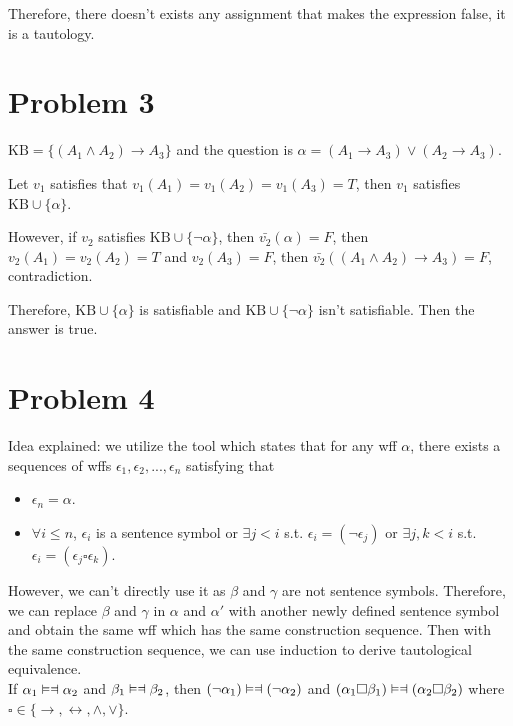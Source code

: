 \documentclass{article}
\newcommand \logequiv						{\vDash\mathrel{\text{\reflectbox{$\vDash$}}}}
\begin{document}
Therefore, there doesn't exists any assignment that makes the expression false, it is a tautology.

\section*{Problem 3}

$\text{KB} = \{ \left( A_1 \land A_2 \right) \to A_3 \}$ and the question is $\alpha = (A_1\to A_3) \lor (A_2\to A_3)$.

Let $v_1$ satisfies that $v_1(A_1)=v_1(A_2)=v_1(A_3)=T$, then $v_1$ satisfies $\text{KB} \cup \{\alpha\}$.

However, if $v_2$ satisfies $\text{KB} \cup \{\neg\alpha\}$, then $\bar{v_2}(\alpha)=F$, then $v_2(A_1)=v_2(A_2)=T$ and $v_2(A_3)=F$, then $\bar{v_2}((A_1 \land A_2) \to A_3)=F$, contradiction.

Therefore, $\text{KB} \cup \{\alpha\}$ is satisfiable and $\text{KB} \cup \{\neg\alpha\}$ isn't satisfiable. Then the answer is true.

\section*{Problem 4}

\noindent Idea explained: we utilize the tool  which states that for any wff $\alpha$, there exists a sequences of wffs $\epsilon_1, \epsilon_2, ..., \epsilon_n$ satisfying that
\begin{itemize}
	\item $\epsilon_n = \alpha$.
	\item $\forall i \le n$, $\epsilon_i$ is a sentence symbol or $\exists j < i$ s.t. $\epsilon_i = (\neg \epsilon_j)$ or $\exists j, k < i$ s.t. $\epsilon_i = (\epsilon_j \square \epsilon_k)$.
\end{itemize}
However, we can't directly use it as $\beta$ and $\gamma$ are not sentence symbols. Therefore, we can replace $\beta$ and $\gamma$ in $\alpha$ and $\alpha'$ with another newly defined sentence symbol and obtain the same wff which has the same construction sequence. Then with the same construction sequence, we can use induction to derive tautological equivalence.
\\

\Lemma {} If $\alpha_1 \logequiv \alpha_2$ and $\beta_1 \logequiv \beta_2$, then $(\neg \alpha_1) \logequiv (\neg \alpha_2)$ and $(\alpha_1 \square \beta_1) \logequiv (\alpha_2 \square \beta_2)$ where $\square \in \{ \to, \leftrightarrow, \land, \lor\}$.
\end{document}
